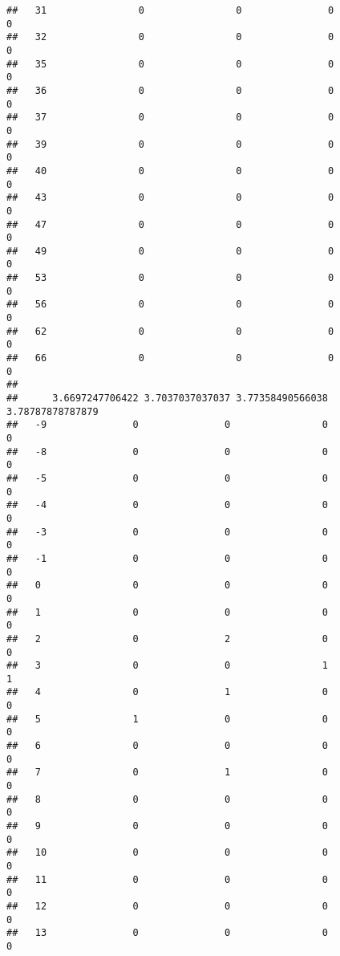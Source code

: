 \documentclass[]{article}
\begin{document}
\begin{verbatim}
##   31                0                0               0                0
##   32                0                0               0                0
##   35                0                0               0                0
##   36                0                0               0                0
##   37                0                0               0                0
##   39                0                0               0                0
##   40                0                0               0                0
##   43                0                0               0                0
##   47                0                0               0                0
##   49                0                0               0                0
##   53                0                0               0                0
##   56                0                0               0                0
##   62                0                0               0                0
##   66                0                0               0                0
##     
##      3.6697247706422 3.7037037037037 3.77358490566038 3.78787878787879
##   -9               0               0                0                0
##   -8               0               0                0                0
##   -5               0               0                0                0
##   -4               0               0                0                0
##   -3               0               0                0                0
##   -1               0               0                0                0
##   0                0               0                0                0
##   1                0               0                0                0
##   2                0               2                0                0
##   3                0               0                1                1
##   4                0               1                0                0
##   5                1               0                0                0
##   6                0               0                0                0
##   7                0               1                0                0
##   8                0               0                0                0
##   9                0               0                0                0
##   10               0               0                0                0
##   11               0               0                0                0
##   12               0               0                0                0
##   13               0               0                0                0

\end{verbatim}
\end{document}
